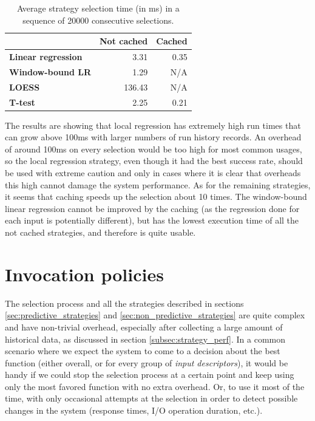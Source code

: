 \begin{table}[h!]
	\captionsetup{justification=centering,margin=0.5cm}
	\centering
	\bgroup
	\def\arraystretch{1.5}%
	\begin{tabular}{|l|r|r|}
		\hline
		& \multicolumn{1}{l|}{\textbf{Not cached}} & \multicolumn{1}{l|}{\textbf{Cached}} \\ \hline
		\textbf{Linear regression} & 3.31                                   & 0.35                                 \\ \hline
		\textbf{Window-bound LR}   & 1.29                                   & N/A                                  \\ \hline
		\textbf{LOESS}             & 136.43                                 & N/A                                  \\ \hline
		\textbf{T-test}            & 2.25                                   & 0.21                                 \\ \hline
	\end{tabular}
\egroup
\caption{Average strategy selection time (in ms) in a sequence of 20000 consecutive selections.}
\label{tab:strategy_execution_comparison}
\end{table}

The results are showing that local regression has extremely high run times that can grow above 100ms with larger numbers of run history records. An overhead of around 100ms on every selection would be too high for most common usages, so the local regression strategy, even though it had the best success rate, should be used with extreme caution and only in cases where it is clear that overheads this high cannot damage the system performance. As for the remaining strategies, it seems that caching speeds up the selection about 10 times. The window-bound linear regression cannot be improved by the caching (as the regression done for each input is potentially different), but has the lowest execution time of all the not cached strategies, and therefore is quite usable.

\section{Invocation policies}

The selection process and all the strategies described in sections \ref{sec:predictive_strategies} and \ref{sec:non_predictive_strategies} are quite complex and have non-trivial overhead, especially after collecting a large amount of historical data, as discussed in section \ref{subsec:strategy_perf}. In a common scenario where we expect the system to come to a decision about the best function (either overall, or for every group of \textit{input descriptors}), it would be handy if we could stop the selection process at a certain point and keep using only the most favored function with no extra overhead. Or, to use it most of the time, with only occasional attempts at the selection in order to detect possible changes in the system (response times, I/O operation duration, etc.).

